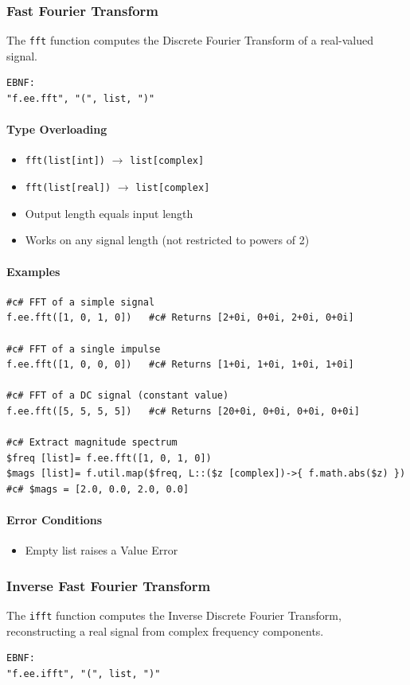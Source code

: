 \subsubsection{Fast Fourier Transform}
The \texttt{fft} function computes the Discrete Fourier Transform of a real-valued signal.
\begin{verbatim}
EBNF:
"f.ee.fft", "(", list, ")"
\end{verbatim}

\paragraph{Type Overloading}
\begin{itemize}
\item \texttt{fft(list[int])} $\rightarrow$ \texttt{list[complex]}
\item \texttt{fft(list[real])} $\rightarrow$ \texttt{list[complex]}
\item Output length equals input length
\item Works on any signal length (not restricted to powers of 2)
\end{itemize}

\paragraph{Examples}
\begin{verbatim}
#c# FFT of a simple signal
f.ee.fft([1, 0, 1, 0])   #c# Returns [2+0i, 0+0i, 2+0i, 0+0i]

#c# FFT of a single impulse
f.ee.fft([1, 0, 0, 0])   #c# Returns [1+0i, 1+0i, 1+0i, 1+0i]

#c# FFT of a DC signal (constant value)
f.ee.fft([5, 5, 5, 5])   #c# Returns [20+0i, 0+0i, 0+0i, 0+0i]

#c# Extract magnitude spectrum
$freq [list]= f.ee.fft([1, 0, 1, 0])
$mags [list]= f.util.map($freq, L::($z [complex])->{ f.math.abs($z) })
#c# $mags = [2.0, 0.0, 2.0, 0.0]
\end{verbatim}

\paragraph{Error Conditions}
\begin{itemize}
\item Empty list raises a Value Error
\end{itemize}

\subsubsection{Inverse Fast Fourier Transform}
The \texttt{ifft} function computes the Inverse Discrete Fourier Transform, reconstructing a real signal from complex frequency components.
\begin{verbatim}
EBNF:
"f.ee.ifft", "(", list, ")"
\end{verbatim}


